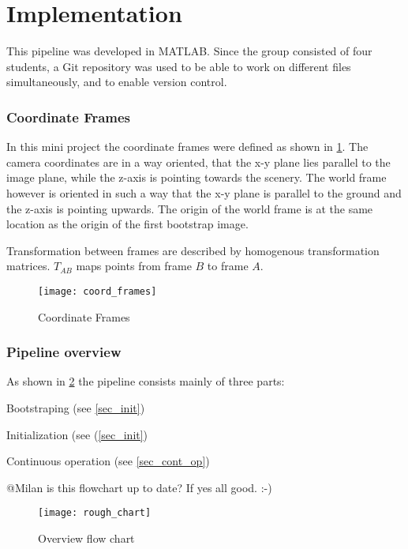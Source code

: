\section{Implementation}

This pipeline was developed in MATLAB. Since the group consisted of four students, a Git repository was used to be able to work on different files simultaneously, and to enable version control.

\subsubsection{Coordinate Frames}
In this mini project the coordinate frames were defined as shown in \cref{img_coord_frames}. The camera coordinates are in a way oriented, that the x-y plane lies parallel to the image plane, while the z-axis is pointing towards the scenery. The world frame however is oriented in such a way that the x-y plane is parallel to the ground and the z-axis is pointing upwards. The origin of the world frame is at the same location as the origin of the first bootstrap image.

Transformation between frames are described by homogenous transformation matrices. $T_{AB}$ maps points from frame $B$ to frame $A$.

\begin{figure}[ht]
	\centering
	\texttt{[image: coord\_frames]}
	\caption{Coordinate Frames}
	\label{img_coord_frames}
\end{figure}

\subsubsection{Pipeline overview}

As shown in \cref{img_flow_rough} the pipeline consists mainly of three parts:
\begin{compactenum}
	\item Bootstraping (see \cref{sec_init})
	\item Initialization (see (\cref{sec_init})
	\item Continuous operation (see \cref{sec_cont_op})
\end{compactenum}

@Milan is this flowchart up to date? If yes all good. :-)

\begin{figure}[ht]
	\centering
	\texttt{[image: rough\_chart]}
	\caption{Overview flow chart}
	\label{img_flow_rough}
\end{figure}


